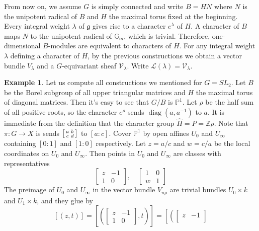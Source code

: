 \documentclass[11pt, a4paper]{article}
\theoremstyle{definition}
\newtheorem{example}[theorem]{Example}
\newcommand{\Z}[0]{\mathbb{Z}}
\newcommand{\g}{\mathfrak g}
\begin{document}
    From now on, we assume $G$ is simply connected and write $B=HN$ where $N$ is the unipotent radical of $B$ and $H$ the maximal torus fixed at the beginning. Every integral weight $\lambda$ of $\g$ gives rise to a character $e^\lambda$ of $H$. A character of $B$ maps $N$ to the unipotent radical of $\mathbb G_m$, which is trivial. Therefore, one-dimensional $B$-modules are equivalent to characters of $H$. For any integral weight $\lambda$ defining a character of $H$, by the previous constructions we obtain a vector bundle $V_\lambda$ and a $G$-equivariant sheaf $\mathcal V_\lambda$. Write $\mathcal L(\lambda)=\mathcal V_\lambda$.
    \begin{example}\label{exp-sl2-L}
        Let us compute all constructions we mentioned for $G=SL_2$. Let $B$ be the Borel subgroup of all upper triangular matrices and $H$ the maximal torus of diagonal matrices. Then it's easy to see that $G/B$ is $\mathbb P^1$. Let $\rho$ be the half sum of all positive roots, so the character $e^\rho$ sends $\operatorname{diag}(a, a^{-1})$ to $a$. It is immediate from the definition that the character group $\widehat{H}=P=\Z\rho$. Note that $\pi:G\to X$ is sends
        $\begin{bsmallmatrix}
          a & b\\
          c & d  
        \end{bsmallmatrix}$ 
        to $[a:c]$. Cover $\mathbb P^1$ by open affines $U_0$ and $U_\infty$ containing $[0:1]$ and $[1:0]$ respectively. Let $z=a/c$ and $w=c/a$ be the local coordinates on $U_0$ and $U_\infty$. Then points in $U_0$ and $U_\infty$ are classes with representatives
        \[\begin{bmatrix}
            z & -1\\
            1 & 0
        \end{bmatrix}, \quad \begin{bmatrix}
            1 & 0\\
            w & 1
        \end{bmatrix}\]
        The preimage of $U_0$ and $U_\infty$ in the vector bundle $V_{n\rho}$ are trivial bundles $U_0\times k$ and $U_1\times k$, and they glue by
        \[[(z, t)]=\left[\left(\begin{bmatrix}
            z & -1\\
            1 & 0
        \end{bmatrix}, t\right)\right]=\left[\left(\begin{bmatrix}
            z & -1\\

\end{bmatrix}\]
\end{example}
\end{document}
